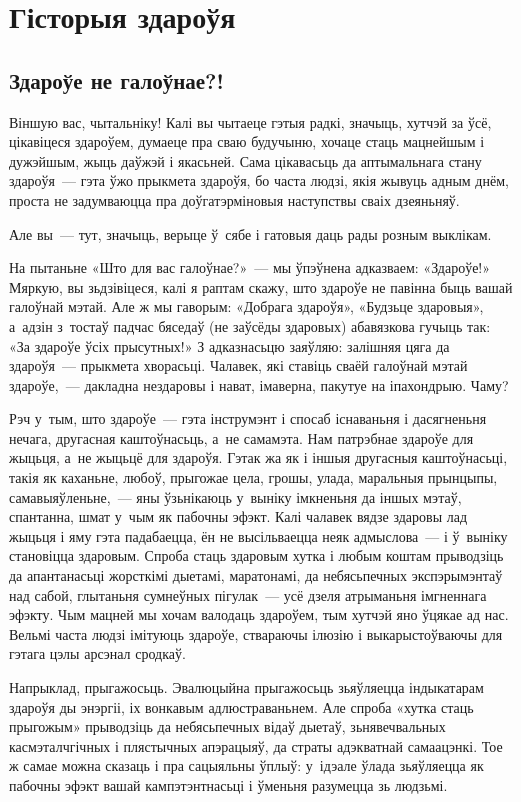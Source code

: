 \chapter{Гісторыя здароўя}

\section{Здароўе не галоўнае?!}

Віншую вас, чытальніку! Калі вы чытаеце гэтыя радкі, значыць, хутчэй за ўсё, цікавіцеся здароўем, думаеце пра сваю будучыню, хочаце стаць мацнейшым і дужэйшым, жыць даўжэй і якасьней. Сама цікавасьць да аптымальнага стану здароўя~--- гэта ўжо прыкмета здароўя, бо часта людзі, якія жывуць адным днём, проста не задумваюцца пра доўгатэрміновыя наступствы сваіх дзеяньняў. 

Але вы~--- тут, значыць, верыце ў~сябе і гатовыя даць рады розным выклікам.

На пытаньне «Што для вас галоўнае?»~--- мы ўпэўнена адказваем: «Здароўе!» Мяркую, вы зьдзівіцеся, калі я раптам скажу, што здароўе не павінна быць вашай галоўнай мэтай. Але ж мы гаворым: «Добрага здароўя», «Будзьце здаровыя», а~адзін з~тостаў падчас бяседаў (не заўсёды здаровых) абавязкова гучыць так: «За здароўе ўсіх прысутных!» З адказнасьцю заяўляю: залішняя цяга да здароўя~--- прыкмета хворасьці. Чалавек, які ставіць сваёй галоўнай мэтай здароўе,~--- дакладна нездаровы і нават, імаверна, пакутуе на іпахондрыю. Чаму?

Рэч у~тым, што здароўе~--- гэта інструмэнт і спосаб існаваньня і дасягненьня нечага, другасная каштоўнасьць, а~не самамэта. Нам патрэбнае здароўе для жыцьця, а~не жыцьцё для здароўя. Гэтак жа як і іншыя другасныя каштоўнасьці, такія як каханьне, любоў, прыгожае цела, грошы, улада, маральныя прынцыпы, самавыяўленьне,~--- яны ўзьнікаюць у~выніку імкненьня да іншых мэтаў, спантанна, шмат у~чым як пабочны эфэкт. Калі чалавек вядзе здаровы лад жыцьця і яму гэта падабаецца, ён не высільваецца неяк адмыслова~--- і ў~выніку становіцца здаровым. Спроба стаць здаровым хутка і любым коштам прыводзіць да апантанасьці жорсткімі дыетамі, маратонамі, да небясьпечных экспэрымэнтаў над сабой, глытаньня сумнеўных пігулак~--- усё дзеля атрыманьня імгненнага эфэкту. Чым мацней мы хочам валодаць здароўем, тым хутчэй яно ўцякае ад нас. Вельмі часта людзі імітуюць здароўе, ствараючы ілюзію і выкарыстоўваючы для гэтага цэлы арсэнал сродкаў.

Напрыклад, прыгажосьць. Эвалюцыйна прыгажосьць зьяўляецца індыкатарам здароўя ды энэргіі, іх вонкавым адлюстраваньнем. Але спроба «хутка стаць прыгожым» прыводзіць да небясьпечных відаў дыетаў, зьнявечвальных касмэталчгічных і плястычных апэрацыяў, да страты адэкватнай самаацэнкі. Тое ж самае можна сказаць і пра сацыяльны ўплыў: у~ідэале ўлада зьяўляецца як пабочны эфэкт вашай кампэтэнтнасьці і ўменьня разумецца зь людзьмі.

